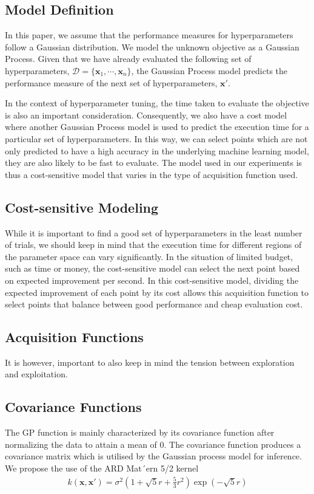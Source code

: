 \documentclass[letterpaper]{article}
\begin{document}
\subsection{Model Definition}
In this paper, we assume that the performance measures for hyperparameters follow a 
Gaussian distribution. We model the unknown objective as a Gaussian Process.
Given that we have already evaluated the following set of hyperparameters, 
$\mathcal{D}=\{\textbf{x}_1, \cdots, \textbf{x}_n\}$, the Gaussian 
Process model predicts the performance measure of the next set of hyperparameters,
$\textbf{x}'$.

In the context of hyperparameter tuning, the time taken to evaluate the objective is
also an important consideration. Consequently, we also have a cost model where
another Gaussian Process model is used to predict the execution time for a particular
set of hyperparameters. In this way, we can select points which are not only
predicted to have a high accuracy in the underlying machine learning model, they
are also likely to be fast to evaluate. The model used in our experiments is thus
a cost-sensitive model that varies in the type of acquisition function used.

\subsection{Cost-sensitive Modeling}
While it is important to find a good set of hyperparameters in the least number of 
trials, we should keep in mind that the execution time for different regions of the 
parameter space can vary significantly. In the situation of limited budget, such as 
time or money, the cost-sensitive model can select the next point based on expected 
improvement per second. In this cost-sensitive model, dividing the expected improvement 
of each point by its cost allows this acquisition function to select points that 
balance between good performance and cheap evaluation cost.

\subsection{Acquisition Functions}
It is however, important to also keep in mind the tension between exploration and
exploitation.

\subsection{Covariance Functions}
The GP function is mainly characterized by its covariance function after normalizing the data to attain a mean of 0. The covariance function produces a covariance matrix which is utilised by the Gaussian process model for inference.
We propose the use of the ARD Mat´ern 5/2 kernel
\begin{align*}
	k (\textbf{x},\textbf{x}') = \sigma^2(1+\sqrt5r+\frac{5}{3}r^2)\exp(-\sqrt5r)
\end{align*}
\end{document}
